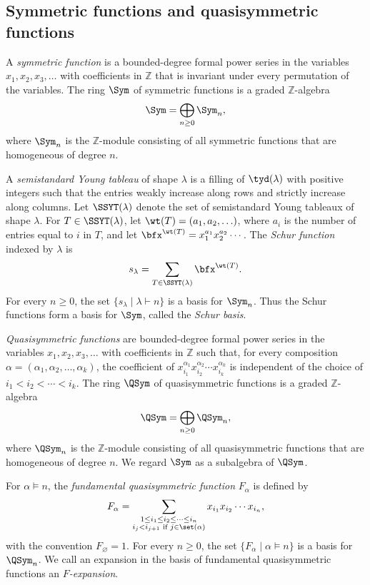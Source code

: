 \documentclass[12pt, reqno]{amsart}
\numberwithin{equation}{section}
\numberwithin{figure}{section}
\numberwithin{table}{section}
\theoremstyle{definition}
\def\Z{\mathbb Z}
\begin{document}
\subsection{Symmetric functions and quasisymmetric functions}
\label{subsec: qsym prelim}


A \emph{symmetric function} is a bounded-degree formal power series in the variables $x_1,x_2,x_3,\ldots$ with coefficients in $\Z$ that is invariant under every permutation of the variables. 
The ring $\Sym$ of symmetric functions is a graded $\Z$-algebra
\[
\Sym=\bigoplus_{n\ge 0}\Sym_n,
\]
where $\Sym_n$ is the $\Z$-module consisting of all symmetric functions that are homogeneous of degree $n$.

A \emph{semistandard Young tableau} of shape $\lambda$ is a filling of $\tyd(\lambda)$ with positive integers such that the entries weakly increase along rows and strictly increase along columns. 
Let $\SSYT(\lambda)$ denote the set of semistandard Young tableaux of shape $\lambda$.
For $T\in\SSYT(\lambda)$, let $\wt(T)=(a_1,a_2,\ldots)$, where $a_i$ is the number
of entries equal to $i$ in $T$, and let $\bfx^{\wt(T)}=x_1^{a_1}x_2^{a_2}\cdots$. 
The \emph{Schur function} indexed by $\lambda$ is
\[
s_\lambda=\sum_{T\in\SSYT(\lambda)}\bfx^{\wt(T)}.
\]
For every $n\ge 0$, the set $\{s_\lambda\mid \lambda\vdash n\}$ is a basis for $\Sym_n$. Thus the Schur functions form a basis for $\Sym$, called the \emph{Schur basis}.


\emph{Quasisymmetric functions} are bounded-degree formal power series in the variables $x_1,x_2,x_3,\ldots$ with coefficients in $\Z$ such that, for every composition $\alpha=(\alpha_1,\alpha_2,\ldots,\alpha_k)$, the coefficient of $x_{i_1}^{\alpha_1}x_{i_2}^{\alpha_2}\cdots x_{i_k}^{\alpha_k}$ is independent of the choice of $i_1<i_2<\cdots<i_k$. 
The ring $\QSym$ of quasisymmetric functions is a graded $\Z$-algebra
\[
\QSym=\bigoplus_{n\ge 0}\QSym_n,
\]
where $\QSym_n$ is the $\Z$-module consisting of all quasisymmetric functions that are homogeneous of degree $n$. 
We regard $\Sym$ as a subalgebra of $\QSym$.

For $\alpha\models n$, the \emph{fundamental quasisymmetric function} $F_\alpha$ is defined by
\[
F_\alpha
=\sum_{\substack{1\le i_1\le i_2\le \cdots\le i_n\\
i_j<i_{j+1}\text{ if }j\in \set(\alpha)}}
x_{i_1}x_{i_2}\cdots x_{i_n},
\]
with the convention $F_\varnothing=1$.
For every $n\ge 0$, the set $\{F_\alpha\mid \alpha\models n\}$ is a basis for $\QSym_n$.
We call an expansion in the basis of fundamental quasisymmetric functions an \emph{$F$-expansion}.
\end{document}
